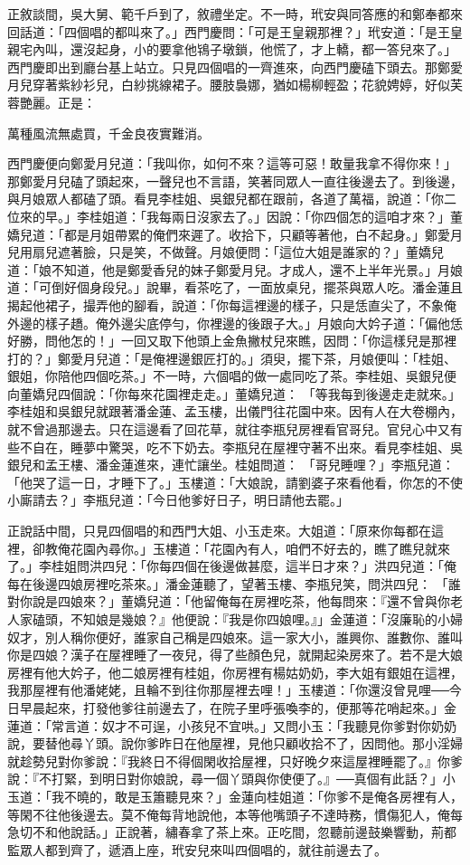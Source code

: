 正敘談間，吳大舅、範千戶到了，敘禮坐定。不一時，玳安與同答應的和鄭奉都來回話道：「四個唱的都叫來了。」西門慶問：「可是王皇親那裡？」玳安道：「是王皇親宅內叫，還沒起身，小的要拿他鴇子墩鎖，他慌了，才上轎，都一答兒來了。」西門慶即出到廳台基上站立。只見四個唱的一齊進來，向西門慶磕下頭去。那鄭愛月兒穿著紫紗衫兒，白紗挑線裙子。腰肢裊娜，猶如楊柳輕盈；花貌娉婷，好似芙蓉艷麗。正是：

萬種風流無處買，千金良夜實難消。

西門慶便向鄭愛月兒道：「我叫你，如何不來？這等可惡！敢量我拿不得你來！」那鄭愛月兒磕了頭起來，一聲兒也不言語，笑著同眾人一直往後邊去了。到後邊，與月娘眾人都磕了頭。看見李桂姐、吳銀兒都在跟前，各道了萬福，說道：「你二位來的早。」李桂姐道：「我每兩日沒家去了。」因說：「你四個怎的這咱才來？」董嬌兒道：「都是月姐帶累的俺們來遲了。收拾下，只顧等著他，白不起身。」鄭愛月兒用扇兒遮著臉，只是笑，不做聲。月娘便問：「這位大姐是誰家的？」董嬌兒道：「娘不知道，他是鄭愛香兒的妹子鄭愛月兒。才成人，還不上半年光景。」月娘道：「可倒好個身段兒。」說畢，看茶吃了，一面放桌兒，擺茶與眾人吃。潘金蓮且揭起他裙子，撮弄他的腳看，說道：「你每這裡邊的樣子，只是恁直尖了，不象俺外邊的樣子趫。俺外邊尖底停勻，你裡邊的後跟子大。」月娘向大妗子道：「偏他恁好勝，問他怎的！」一回又取下他頭上金魚撇杖兒來瞧，因問：「你這樣兒是那裡打的？」鄭愛月兒道：「是俺裡邊銀匠打的。」須臾，擺下茶，月娘便叫：「桂姐、銀姐，你陪他四個吃茶。」不一時，六個唱的做一處同吃了茶。李桂姐、吳銀兒便向董嬌兒四個說：「你每來花園裡走走。」董嬌兒道： 「等我每到後邊走走就來。」李桂姐和吳銀兒就跟著潘金蓮、孟玉樓，出儀門往花園中來。因有人在大卷棚內，就不曾過那邊去。只在這邊看了回花草，就往李瓶兒房裡看官哥兒。官兒心中又有些不自在，睡夢中驚哭，吃不下奶去。李瓶兒在屋裡守著不出來。看見李桂姐、吳銀兒和孟王樓、潘金蓮進來，連忙讓坐。桂姐問道： 「哥兒睡哩？」李瓶兒道：「他哭了這一日，才睡下了。」玉樓道：「大娘說，請劉婆子來看他看，你怎的不使小廝請去？」李瓶兒道：「今日他爹好日子，明日請他去罷。」

正說話中間，只見四個唱的和西門大姐、小玉走來。大姐道：「原來你每都在這裡，卻教俺花園內尋你。」玉樓道：「花園內有人，咱們不好去的，瞧了瞧兒就來了。」李桂姐問洪四兒：「你每四個在後邊做甚麼，這半日才來？」洪四兒道：「俺每在後邊四娘房裡吃茶來。」潘金蓮聽了，望著玉樓、李瓶兒笑，問洪四兒： 「誰對你說是四娘來？」董嬌兒道：「他留俺每在房裡吃茶，他每問來：『還不曾與你老人家磕頭，不知娘是幾娘？』他便說：『我是你四娘哩。』」金蓮道：「沒廉恥的小婦奴才，別人稱你便好，誰家自己稱是四娘來。這一家大小，誰興你、誰數你、誰叫你是四娘？漢子在屋裡睡了一夜兒，得了些顏色兒，就開起染房來了。若不是大娘房裡有他大妗子，他二娘房裡有桂姐，你房裡有楊姑奶奶，李大姐有銀姐在這裡，我那屋裡有他潘姥姥，且輪不到往你那屋裡去哩！」玉樓道：「你還沒曾見哩──今日早晨起來，打發他爹往前邊去了，在院子里呼張喚李的，便那等花哨起來。」金蓮道：「常言道：奴才不可逞，小孩兒不宜哄。」又問小玉：「我聽見你爹對你奶奶說，要替他尋丫頭。說你爹昨日在他屋裡，見他只顧收拾不了，因問他。那小淫婦就趁勢兒對你爹說：『我終日不得個閑收拾屋裡，只好晚夕來這屋裡睡罷了。』你爹說：『不打緊，到明日對你娘說，尋一個丫頭與你使便了。』──真個有此話？」小玉道：「我不曉的，敢是玉簫聽見來？」金蓮向桂姐道：「你爹不是俺各房裡有人，等閑不往他後邊去。莫不俺每背地說他，本等他嘴頭子不達時務，慣傷犯人，俺每急切不和他說話。」正說著，繡春拿了茶上來。正吃間，忽聽前邊鼓樂響動，荊都監眾人都到齊了，遞酒上座，玳安兒來叫四個唱的，就往前邊去了。

